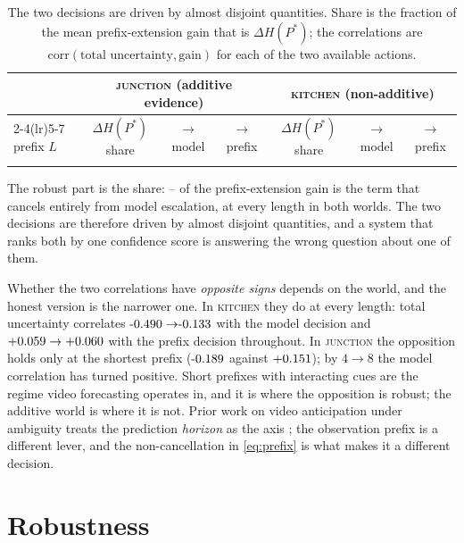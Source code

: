 \documentclass[10pt]{article}
\newcommand{\Pstar}{P^{*}}
\begin{document}
\begin{table}[t]
\centering
\small
\caption{The two decisions are driven by almost disjoint quantities. Share is the fraction of the
mean prefix-extension gain that is $\Delta H(\Pstar)$; the correlations are
$\mathrm{corr}(\text{total uncertainty}, \text{gain})$ for each of the two available actions.}
\label{tab:prefix}
\begin{tabular}{lcccccc}
\toprule
& \multicolumn{3}{c}{\textsc{junction} (additive evidence)} & \multicolumn{3}{c}{\textsc{kitchen} (non-additive)} \\
\cmidrule(lr){2-4}\cmidrule(lr){5-7}
prefix $L$ & $\Delta H(\Pstar)$ share & $\to$ model & $\to$ prefix & $\Delta H(\Pstar)$ share & $\to$ model & $\to$ prefix \\
\midrule
 \\
\bottomrule
\end{tabular}
\end{table}

The robust part is the share: \PreShareLo--\PreShareHi{} of the prefix-extension gain is the term
that cancels entirely from model escalation, at every length in both worlds. The two decisions are
therefore driven by almost disjoint quantities, and a system that ranks both by one confidence
score is answering the wrong question about one of them.

Whether the two correlations have \emph{opposite signs} depends on the world, and the honest
version is the narrower one. In \textsc{kitchen} they do at every length: total uncertainty
correlates $\PreKModelOne \to \PreKModelEight$ with the model decision and
$+0.059 \to +0.060$ with the prefix decision throughout. In \textsc{junction} the
opposition holds only at the shortest prefix ($\PreJModelOne$ against $+0.151$); by
$4\to8$ the model correlation has turned positive. Short prefixes with interacting cues are the
regime video forecasting operates in, and it is where the opposition is robust; the additive world
is where it is not. Prior work on video anticipation under ambiguity treats the prediction
\emph{horizon} as the axis \citep{farha2019uncertainty}; the observation prefix is a different
lever, and the non-cancellation in \eqref{eq:prefix} is what makes it a different decision.

\section{Robustness}
\label{sec:robustness}
\end{document}
